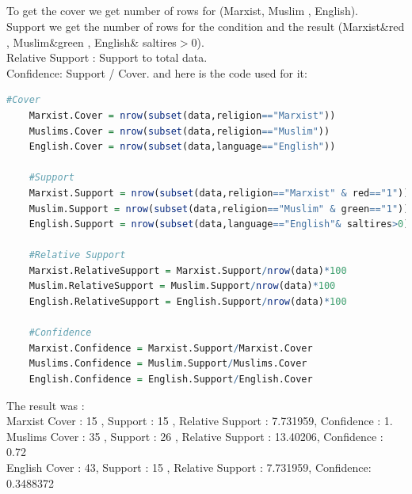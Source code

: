 \documentclass{article}
\begin{document}
	\subsection*{}
	To get the cover we get number of rows for (Marxist, Muslim , English).\\
	Support we get the number of rows for the condition and the result (Marxist\&red , Muslim\&green , English\& saltires\(>\)0).\\
	Relative Support : Support to total data.\\
	Confidence: Support / Cover. and here is the code used for it:
	\begin{lstlisting}[language=R]
	#Cover
	Marxist.Cover = nrow(subset(data,religion=="Marxist"))
	Muslims.Cover = nrow(subset(data,religion=="Muslim"))
	English.Cover = nrow(subset(data,language=="English"))
	
	#Support
	Marxist.Support = nrow(subset(data,religion=="Marxist" & red=="1"))
	Muslim.Support = nrow(subset(data,religion=="Muslim" & green=="1"))
	English.Support = nrow(subset(data,language=="English"& saltires>0))
	
	#Relative Support
	Marxist.RelativeSupport = Marxist.Support/nrow(data)*100
	Muslim.RelativeSupport = Muslim.Support/nrow(data)*100
	English.RelativeSupport = English.Support/nrow(data)*100
	
	#Confidence 
	Marxist.Confidence = Marxist.Support/Marxist.Cover
	Muslims.Confidence = Muslim.Support/Muslims.Cover
	English.Confidence = English.Support/English.Cover
	\end{lstlisting}
	The result was : \\
	Marxist Cover : 15 , Support : 15 , Relative Support : 7.731959, Confidence : 1.\\
	Muslims Cover : 35 , Support : 26 , Relative Support : 13.40206, Confidence : 0.72\\
	English Cover : 43, Support : 15 , Relative Support : 7.731959, Confidence: 0.3488372\\
\end{document}
